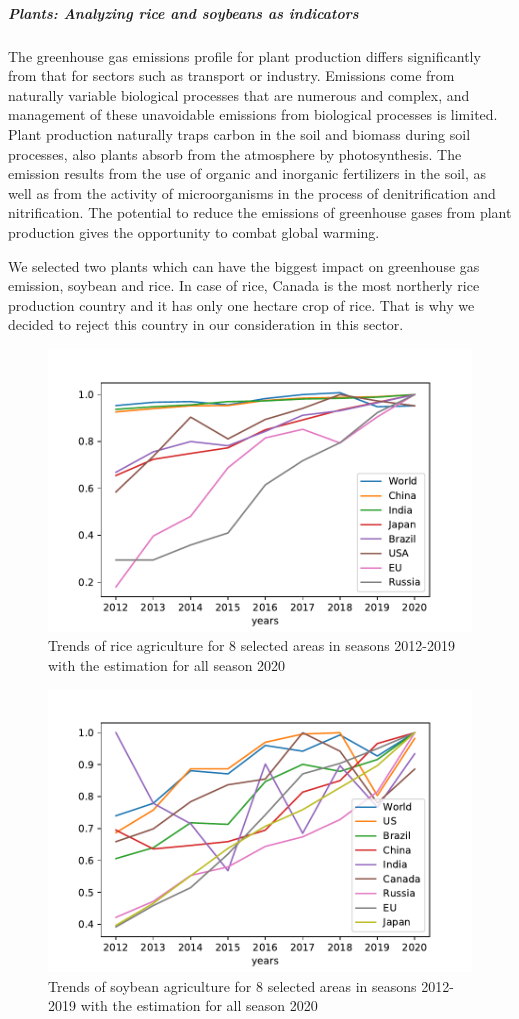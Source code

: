 \subparagraph{Plants: Analyzing rice and soybeans as indicators}

The greenhouse gas emissions profile for plant production differs significantly from that for sectors such as transport or industry. Emissions come from naturally variable biological processes that are numerous and complex, and management of these unavoidable emissions from biological processes is limited. Plant production naturally traps carbon in the soil and biomass during soil processes, also plants absorb \co from the atmosphere by photosynthesis. The emission results from the use of organic and inorganic fertilizers in the soil, as well as from the activity of microorganisms in the process of denitrification and nitrification. The potential to reduce the emissions of greenhouse gases from plant production gives the opportunity to combat global warming. 

We selected two plants which can have the biggest impact on greenhouse gas emission, soybean and rice. In case of rice, Canada is the most northerly rice production country and it has only one hectare crop of rice. That is why we decided to reject this country in our consideration in this sector. 

\begin{figure}
	\centering
	\includegraphics[width=0.7\linewidth]{../agriculture/Graph_rice.pdf}
	\caption{Trends of rice agriculture for 8 selected areas in seasons 2012-2019 with the estimation for all season 2020}
	\label{fig:Graph_rice}
\end{figure}

\begin{figure}
	\centering
	\includegraphics[width=0.7\linewidth]{../agriculture/Graph_soybean.pdf}
	\caption{Trends of soybean agriculture for 8 selected areas in seasons 2012-2019 with the estimation for all season 2020}
	\label{fig:Graph_soybean}
\end{figure}

